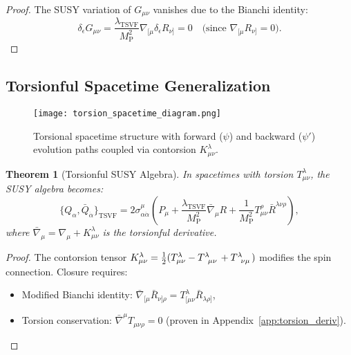 \documentclass[12pt, onecolumn]{article}
\newtheorem{theorem}{Theorem}[section]
\theoremstyle{definition}
\newcommand{\tsvf}{\lambda_{\mathrm{TSVF}}}
\newcommand{\Mp}{M_{\mathrm{P}}}
\numberwithin{equation}{section}
\begin{document}
\begin{proof}
The SUSY variation of \(G_{\mu\nu}\) vanishes due to the Bianchi identity:
\begin{equation}
\delta_\epsilon G_{\mu\nu} = \frac{\tsvf}{\Mp^2} \nabla_{[\mu} \delta_\epsilon R_{\nu]} = 0 \quad \text{(since \(\nabla_{[\mu} R_{\nu]} = 0\))}.
\label{eq:G_SUSY_inv}
\end{equation}
\end{proof}

\subsection{Torsionful Spacetime Generalization} 
\label{subsec:torsion}

\begin{figure}[htbp]
\centering
\texttt{[image: torsion\_spacetime\_diagram.png]}
\caption{Torsional spacetime structure with forward (\(\psi\)) and backward (\(\psi'\)) evolution paths coupled via contorsion \(K^\lambda_{\mu\nu}\).}
\label{fig:torsion}
\end{figure}

\begin{theorem}[Torsionful SUSY Algebra]
\label{thm:torsion_SUSY}
In spacetimes with torsion \(T^\lambda_{\mu\nu}\), the SUSY algebra becomes:
\begin{equation}
\{Q_\alpha, \bar{Q}_{\dot{\alpha}}\}_{\text{TSVF}} = 2\sigma^\mu_{\alpha\dot{\alpha}}\left(P_\mu + \frac{\tsvf}{\Mp^2}\bar{\nabla}_\mu R + \frac{1}{\Mp^2}T^\rho_{\mu\nu}\bar{R}^{\lambda\nu\rho}\right),
\label{eq:SUSY_torsion}
\end{equation}
where \(\bar{\nabla}_\mu = \nabla_\mu + K^\lambda_{\mu\nu}\) is the torsionful derivative.
\end{theorem}

\begin{proof}
The contorsion tensor \(K^\lambda_{\mu\nu} = \frac{1}{2}(T^\lambda_{\mu\nu} - T\indices{^\lambda_{\mu\nu}} + T\indices{^\lambda_{\nu\mu}})\) modifies the spin connection. Closure requires:
\begin{itemize}
\item Modified Bianchi identity: \(\bar{\nabla}_{[\mu}\bar{R}_{\nu]\rho} = T^\lambda_{[\mu\nu}\bar{R}_{\lambda\rho]}\),
\item Torsion conservation: \(\bar{\nabla}^\mu T_{\mu\nu\rho} = 0\) (proven in Appendix~\ref{app:torsion_deriv}).
\end{itemize}
\end{proof}
\end{document}
